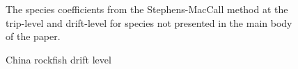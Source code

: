 \documentclass[
  authoryear,
  preprint,
  3p]{elsarticle}
\begin{document}
\begin{figure}
\begin{minipage}[t]{0.50\linewidth}
{{}

\caption{China rockfish drift level}

}

\end{minipage}%
\newline
\begin{minipage}[t]{0.50\linewidth}

{\centering 

The species coefficients from the Stephens-MacCall method at the
trip-level and drift-level for species not presented in the main body of
the paper.

}

\end{minipage}%

\end{figure}


  
\end{document}
